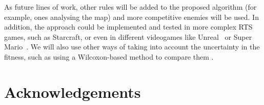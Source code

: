 \documentclass[preprint]{elsarticle}
\begin{document}



As future lines of work, other rules will be added to the proposed algorithm
(for example, ones analysing the map) and more competitive enemies
will be used. In addition, the approach could be implemented and
tested in more complex RTS games, such as Starcraft, or even in
different videogames like Unreal\texttrademark~ or Super
Mario\texttrademark~. We will also use other ways of taking into
account the uncertainty in the fitness, such as using a Wilcoxon-based
method to compare them \cite{merelo2016statistical}. 

\section*{Acknowledgements}



\end{document}
